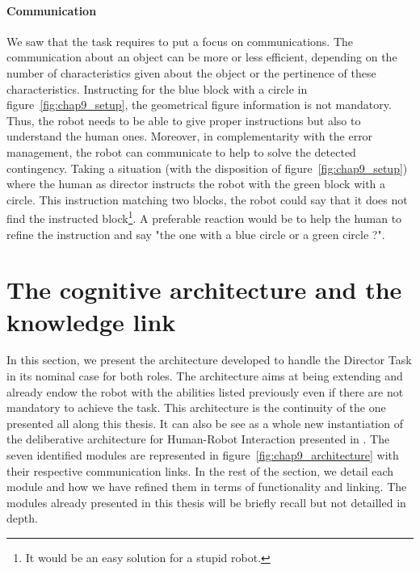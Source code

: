 \paragraph{Communication} We saw that the task requires to put a focus on communications. The communication about an object can be more or less efficient, depending on the number of characteristics given about the object or the pertinence of these characteristics. Instructing for the blue block with a circle in figure~\ref{fig:chap9_setup}, the geometrical figure information is not mandatory. Thus, the robot needs to be able to give proper instructions but also to understand the human ones. Moreover, in complementarity with the error management, the robot can communicate to help to solve the detected contingency. Taking a situation (with the disposition of figure~\ref{fig:chap9_setup}) where the human as director instructs the robot with the green block with a circle. This instruction matching two blocks, the robot could say that it does not find the instructed block\footnote{It would be an easy solution for a stupid robot.}. A preferable reaction would be to help the human to refine the instruction and say "the one with a blue circle or a green circle ?".

\section[Architecture and knowledge link]{The cognitive architecture and the knowledge link}

In this section, we present the architecture developed to handle the Director Task in its nominal case for both roles. The architecture aims at being extending and already endow the robot with the abilities listed previously even if there are not mandatory to achieve the task. This architecture is the continuity of the one presented all along this thesis. It can also be see as a whole new instantiation of the deliberative architecture for Human-Robot Interaction presented in \cite{lemaignan_2017_artificial}. The seven identified modules are represented in figure~\ref{fig:chap9_architecture} with their respective communication links. In the rest of the section, we detail each module and how we have refined them in terms of functionality and linking. The modules already presented in this thesis will be briefly recall but not detailled in depth.

